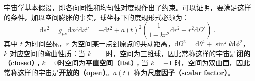 
宇宙学基本假设，即各向同性和均匀性对度规作出了约束。可以证明，要满足这样的条件，加以空间膨胀的事实，球坐标下的度规形式必须为：
\begin{equation}
\mathrm{d}s^2=g_{\mu\nu}\mathrm{d}x^{\mu}\mathrm{d}x^{\nu}=-\mathrm{d}t^2+a(t)^2 \left( \frac{1}{1-kr^2}\mathrm{d}r^2+r^2 \mathrm{d} \Omega^2\right)~.
\end{equation}
其中 $t$ 为时间坐标，$r$ 为空间某一点到原点的共动距离，$\mathrm{d} \Omega^2 =\mathrm{d} \theta^2 + \sin^2\theta\mathrm{d} \phi^2 $，$k$ 对应空间的弯曲性质：当 $k=1$ 时，空间为三维球，因此常称这样的宇宙是\textbf{闭的（closed）}；$k=0$时空间为\textbf{平直空间（flat）}；当 $k=-1$ 时，空间为双曲面，因此常称这样的宇宙是\textbf{开放的（open）}。$a(t)$ 称为\textbf{尺度因子（scalar factor）}。
